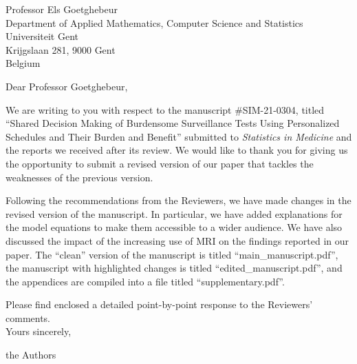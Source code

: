\documentclass[a4paper, 11pt]{letter}
\begin{document}
\begin{letter}{Professor Els Goetghebeur\\
Department of Applied Mathematics, Computer Science and Statistics\\
Universiteit Gent\\
Krijgslaan 281, 9000 Gent\\
Belgium}

\address{Department of Biostatistics\\
Erasmus University Medical Center\\PO Box 2040, 3000 CA Rotterdam\\ the Netherlands
}

\opening{Dear Professor Goetghebeur,}

We are writing to you with respect to the manuscript \#SIM-21-0304, titled ``Shared Decision Making of Burdensome Surveillance Tests Using Personalized Schedules and Their Burden and Benefit'' submitted to \emph{Statistics in Medicine} and the reports we received after its review. We would like to thank you for giving us the opportunity to submit a revised version of our paper that tackles the weaknesses of the previous version.

Following the recommendations from the Reviewers, we have made changes in the revised version of the manuscript. In particular, we have added explanations for the model equations to make them accessible to a wider audience. We have also discussed the impact of the increasing use of MRI on the findings reported in our paper. The ``clean'' version of the manuscript is titled ``main\_manuscript.pdf'', the manuscript with highlighted changes is titled ``edited\_manuscript.pdf'', and the appendices are compiled into a file titled ``supplementary.pdf''.

Please find enclosed a detailed point-by-point response to the Reviewers' comments.\\

Yours sincerely,

the Authors
\end{letter}
\end{document}
